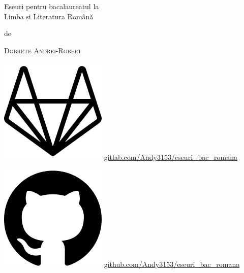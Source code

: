 \documentclass[
 12pt,                       %
 a4paper                     %
]{book}
\begin{document}
\pagestyle{empty}
\begin{titlepage}
 \centering
 \vspace*{1cm}
 \vspace{4\baselineskip}
 {\Huge
 Eseuri pentru bacalaureatul la \\ Limba și Literatura Română\par}
 \vspace{4\baselineskip}
 de\par
 {\Large\textsc{Dobrete Andrei-Robert}\par}
 \vfill
 \includegraphics[height=\fontcharht\font`\B]{gitlab}
 \url{gitlab.com/Andy3153/eseuri_bac_romana}\par
 \includegraphics[height=\fontcharht\font`\B]{github}
 \url{github.com/Andy3153/eseuri_bac_romana}\par
 \vspace{1.5\baselineskip}
 {\large\LaTeXe}
\end{titlepage}



\tableofcontents %

\end{document}
